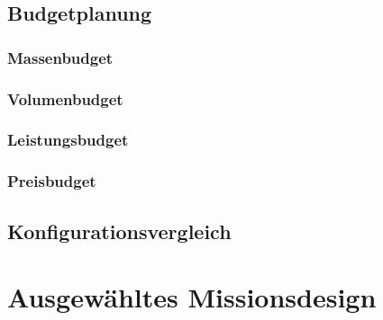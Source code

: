 				\subsection{Budgetplanung}
				
						\subsubsection{Massenbudget}
								
										
						\subsubsection{Volumenbudget}
								
								
						\subsubsection{Leistungsbudget}
						\subsubsection{Preisbudget}
				
				\subsection{Konfigurationsvergleich}
		
		\section{	Ausgewähltes Missionsdesign}
				
